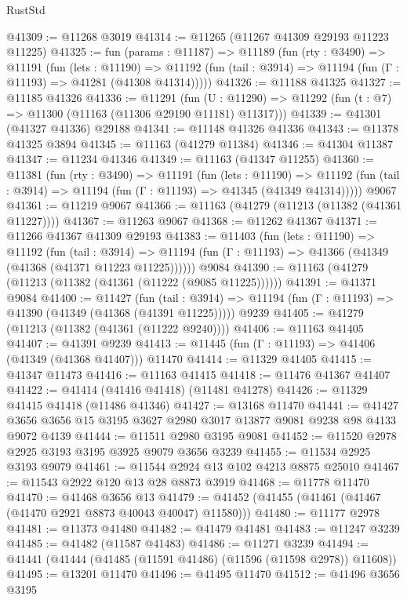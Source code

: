 \begin{lexlean}{RustStd}
\begin{coremodule}
@41309 := @11268 @3019
@41314 := @11265 (@11267 @41309 @29193 @11223 @11225)
@41325 := fun (params : @11187) =>
  @11189
    (fun (rty : @3490) =>
    @11191
      (fun (lets : @11190) =>
      @11192 (fun (tail : @3914) => @11194 (fun (Γ : @11193) => @41281 (@41308 @41314)))))
@41326 := @11188 @41325
@41327 := @11185 @41326
@41336 := @11291
    (fun (U : @11290) => @11292 (fun (t : @7) => @11300 (@11163 (@11306 @29190 @11181) @11317)))
@41339 := @41301 (@41327 @41336) @29188
@41341 := @11148 @41326 @41336
@41343 := @11378 @41325 @3894
@41345 := @11163 (@41279 @11384)
@41346 := @41304 @11387
@41347 := @11234 @41346
@41349 := @11163 (@41347 @11255)
@41360 := @11381
    (fun (rty : @3490) =>
    @11191
      (fun (lets : @11190) =>
      @11192 (fun (tail : @3914) => @11194 (fun (Γ : @11193) => @41345 (@41349 @41314)))))
    @9067
@41361 := @11219 @9067
@41366 := @11163 (@41279 (@11213 (@11382 (@41361 @11227))))
@41367 := @11263 @9067
@41368 := @11262 @41367
@41371 := @11266 @41367 @41309 @29193
@41383 := @11403
    (fun (lets : @11190) =>
    @11192
      (fun (tail : @3914) =>
      @11194 (fun (Γ : @11193) => @41366 (@41349 (@41368 (@41371 @11223 @11225))))))
    @9084
@41390 := @11163 (@41279 (@11213 (@11382 (@41361 (@11222 (@9085 @11225))))))
@41391 := @41371 @9084
@41400 := @11427
    (fun (tail : @3914) => @11194 (fun (Γ : @11193) => @41390 (@41349 (@41368 (@41391 @11225)))))
    @9239
@41405 := @41279 (@11213 (@11382 (@41361 (@11222 @9240))))
@41406 := @11163 @41405
@41407 := @41391 @9239
@41413 := @11445 (fun (Γ : @11193) => @41406 (@41349 (@41368 @41407))) @11470
@41414 := @11329 @41405
@41415 := @41347 @11473
@41416 := @11163 @41415
@41418 := @11476 @41367 @41407
@41422 := @41414 (@41416 @41418) (@11481 @41278)
@41426 := @11329 @41415 @41418 (@11486 @41346)
@41427 := @13168 @11470
@41441 := @41427 @3656 @3656 @15 @3195 @3627 @2980 @3017 @13877 @9081 @9238 @98 @4133 @9072 @4139
@41444 := @11511 @2980 @3195 @9081
@41452 := @11520 @2978 @2925 @3193 @3195 @3925 @9079 @3656 @3239
@41455 := @11534 @2925 @3193 @9079
@41461 := @11544 @2924 @13 @102 @4213 @8875 @25010
@41467 := @11543 @2922 @120 @13 @28 @8873 @3919
@41468 := @11778 @11470
@41470 := @41468 @3656 @13
@41479 := @41452 (@41455 (@41461 (@41467 (@41470 @2921 @8873 @40043 @40047) @11580)))
@41480 := @11177 @2978
@41481 := @11373 @41480
@41482 := @41479 @41481
@41483 := @11247 @3239
@41485 := @41482 (@11587 @41483)
@41486 := @11271 @3239
@41494 := @41441 (@41444 (@41485 (@11591 @41486) (@11596 (@11598 @2978)) @11608))
@41495 := @13201 @11470
@41496 := @41495 @11470
@41512 := @41496
    @3656
    @3195

\end{coremodule}
\end{lexlean}
